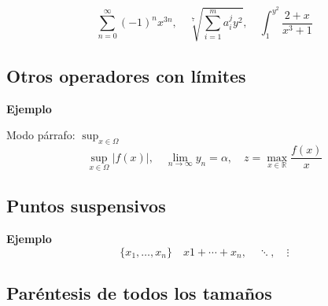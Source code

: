 \documentclass[10pt,a4paper]{report}
\begin{document}
\begin{equation}
\sum_{n=0}^{\infty}(-1)^nx^{3n},
\quad
\sqrt[7]{\sum_{i=1}^{m}a_i^jy^2},
\quad
\int_{1}^{y^2}\frac{2+x}{x^3+1}
\end{equation}
\bigskip




\subsection{Otros operadores con límites}





\bigskip
\textbf{Ejemplo}

Modo párrafo: $\sup_{x\in\Omega}$
\begin{equation}
\sup_{x\in\Omega} |f(x)|,
\quad
\lim_{n\to\infty}y_n=\alpha,
\quad
z=\max_{x\in\mathbb{R}}\frac{f(x)}{x}
\end{equation}
\bigskip








\subsection{Puntos suspensivos}




\bigskip
\textbf{Ejemplo}
\begin{equation}
\{x_1,\dots,x_n\}
\quad
x1 + \cdots + x_n,
\quad
\ddots,
\quad
\vdots
\end{equation}

\bigskip





\subsection{Paréntesis de todos los tamaños}
\end{document}
